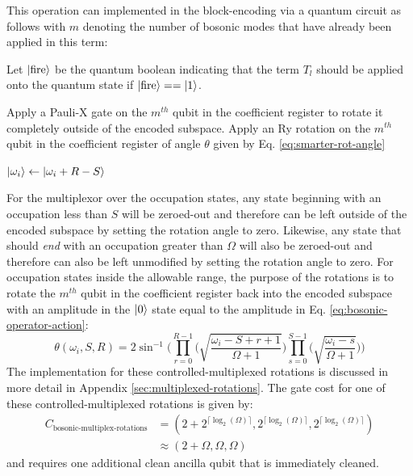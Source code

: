 This operation can implemented in the block-encoding via a quantum circuit as follows with $m$ denoting the number of bosonic modes that have already been applied in this term:
\begin{algorithmic}[1]
    \State Let $\ket{\text{fire}}$ be the quantum boolean indicating that the term $T_l$ should be applied onto the quantum state if $\ket{\text{fire}} == \ket{1}$.


            \State Apply a Pauli-X gate on the $m^{th}$ qubit in the coefficient register to rotate it completely outside of the encoded subspace.
                \State Apply an Ry rotation on the $m^{th}$ qubit in the coefficient register of angle $\theta$ given by Eq. \ref{eq:smarter-rot-angle}
            \EndFor

            \State $\ket{\omega_i} \gets \ket{\omega_i + R - S}$
        \EndIf
    \EndFor
\end{algorithmic}
For the multiplexor over the occupation states, any state beginning with an occupation less than $S$ will be zeroed-out and therefore can be left outside of the encoded subspace by setting the rotation angle to zero.
Likewise, any state that should \textit{end} with an occupation greater than $\Omega$ will also be zeroed-out and therefore can also be left unmodified by setting the rotation angle to zero.
For occupation states inside the allowable range, the purpose of the rotations is to rotate the $m^{th}$ qubit in the coefficient register back into the encoded subspace with an amplitude in the $\ket{0}$ state equal to the amplitude in Eq. \ref{eq:bosonic-operator-action}:
\begin{equation}
    \label{eq:smarter-rot-angle}
    \theta(\omega_i, S, R) = 2 \sin^{-1}{\Big(\prod_{r=0}^{R-1} \big( \sqrt{\frac{\omega_i - S + r + 1}{\Omega + 1}} \big) \prod_{s=0}^{S-1} \big( \sqrt{\frac{\omega_i - s}{\Omega + 1}} \big)\Big)}
\end{equation}
The implementation for these controlled-multiplexed rotations is discussed in more detail in Appendix \ref{sec:multiplexed-rotations}.
The gate cost for one of these controlled-multiplexed rotations is given by:
\begin{equation}
    \begin{split}
        C_{\text{bosonic-multiplex-rotations}} &= (2 + 2^{\lceil \log_2(\Omega) \rceil}, 2^{\lceil \log_2(\Omega) \rceil}, 2^{\lceil \log_2(\Omega) \rceil}) \\
        &\approx (2 + \Omega, \Omega, \Omega)
    \end{split}
\end{equation}
and requires one additional clean ancilla qubit that is immediately cleaned.

